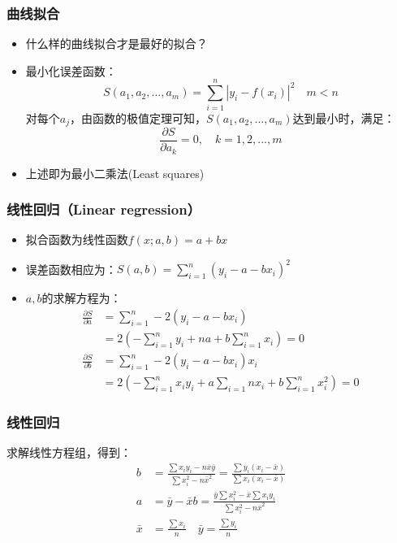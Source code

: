 \documentclass[red,compress]{beamer}
\begin{document}
\begin{frame}
\frametitle{曲线拟合}
\begin{itemize}
\item
什么样的曲线拟合才是最好的拟合？

\item 
最小化误差函数：
\begin{equation*}
	S(a_1,a_2,...,a_m)=\sum_{i=1}^{n}|y_i-f(x_i)|^2 \quad m < n
\end{equation*}
对每个$a_j$，由函数的极值定理可知，$S(a_1,a_2,...,a_m)$达到最小时，满足：
\begin{equation*}
	\frac{\partial S}{\partial a_k}=0, \quad k=1,2,...,m
\end{equation*}

\item 上述即为最小二乘法(Least squares)
\end{itemize}

\end{frame}

\begin{frame}
\frametitle{线性回归（Linear regression）}
\begin{itemize}
\item
拟合函数为线性函数$f(x;a,b)=a+bx$

\item
误差函数相应为：$S(a,b)=\sum_{i=1}^{n}(y_i-a-bx_i)^2$

\item
$a,b$的求解方程为：
\begin{align*}
	\frac{\partial S}{\partial a}&=\sum_{i=1}^{n}-2(y_i-a-bx_i) \\
	&=2(-\sum_{i=1}^{n}y_i+na+b\sum_{i=1}^{n}x_i)=0\\
	\frac{\partial S}{\partial b}&=\sum_{i=1}^{n}-2(y_i-a-bx_i)x_i\\
		&=2(-\sum_{i=1}^{n}x_iy_i+a\sum_{i=1}{n}x_i+b\sum_{i=1}^{n}x_i^2)=0
\end{align*}
\end{itemize}
\end{frame}

\begin{frame}
\frametitle{线性回归}
求解线性方程组，得到：
\begin{align*}
	b &= \frac{\sum x_iy_i-n\bar{x}\bar{y}}{\sum x_i^2-n\bar{x}^2} 
	  = \frac{\sum y_i(x_i-\bar{x})}{\sum x_i(x_i-\bar{x})} \\
	a &= \bar{y}-\bar{x}b 
    	  = \frac{\bar{y}\sum x_i^2-\bar{x}\sum x_i y_i}{\sum x_i^2-n\bar{x}^2} \\
	\bar{x} &= \frac{\sum x_i}{n} \quad
	\bar{y} = \frac{\sum y_i}{n}
\end{align*}
\end{frame}
\end{document}
